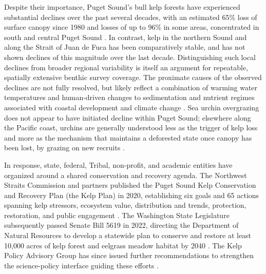 \documentclass[11pt]{article}
\begin{document}
Despite their importance, Puget Sound's bull kelp forests have experienced 
substantial declines over the past several decades, with an estimated 65\% loss 
of surface canopy since 1980 and losses of up to 96\% in some areas, 
concentrated in south and central Puget Sound \citep{Berry:2019aa}. 
In contrast, kelp in the northern Sound and along the Strait of Juan de Fuca 
has been comparatively stable, and has not shown declines of this magnitude
over the last decade.
Distinguishing such local declines from broader regional variability is itself
an argument for repeatable, spatially extensive benthic survey coverage.
The proximate causes of the observed declines are not fully resolved, but 
likely reflect a combination of warming water temperatures and human-driven 
changes to sedimentation and nutrient regimes associated with coastal 
development and climate change \citep{Khangaonkar:2018aa}.
Sea urchin overgrazing does not appear to have initiated decline within Puget
Sound; elsewhere along the Pacific coast, urchins are generally understood less
as the trigger of kelp loss and more as the mechanism that maintains a 
deforested state once canopy has been lost, by grazing on new recruits
\citep{FilbeeDexter:2014aa}.

In response, state, federal, Tribal, non-profit, and academic entities have organized around a shared conservation and recovery agenda.
The Northwest Straits Commission and partners published the Puget Sound Kelp Conservation and Recovery Plan (the Kelp Plan) in 2020, establishing six goals and 65 actions spanning kelp stressors, ecosystem value, distribution and trends, protection, restoration, and public engagement \citep{Calloway:2020aa}.
The Washington State Legislature subsequently passed Senate Bill 5619 in 2022, directing the Department of Natural Resources to develop a statewide plan to conserve and restore at least 10,000 acres of kelp forest and eelgrass meadow habitat by 2040 \citep{Washington:2022aa}.
The Kelp Policy Advisory Group has since issued further recommendations to strengthen the science-policy interface guiding these efforts \citep{KelpPolicyAdvisoryGroup:2023aa}.
\end{document}
